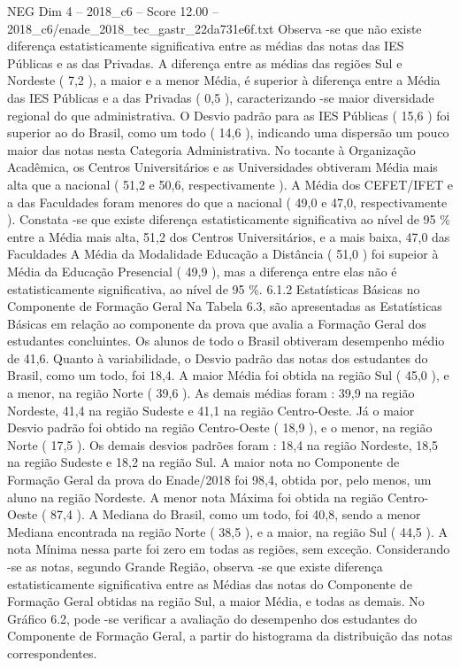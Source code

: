 \begin{textsample}{NEG Dim 4 – 2018\_c6 – Score 12.00 – 2018\_c6/enade\_2018\_tec\_gastr\_22da731e6f.txt}
Observa -se que não existe diferença estatisticamente significativa entre as médias das notas das IES Públicas e as das Privadas.
A diferença entre as médias das regiões Sul e Nordeste ( 7,2 ), a maior e a menor Média, é superior à diferença entre a Média das IES Públicas e a das Privadas ( 0,5 ), caracterizando -se maior diversidade regional do que administrativa.
O Desvio padrão para as IES Públicas ( 15,6 ) foi superior ao do Brasil, como um todo ( 14,6 ), indicando uma dispersão um pouco maior das notas nesta Categoria Administrativa.
No tocante à Organização Acadêmica, os Centros Universitários e as Universidades obtiveram Média mais alta que a nacional ( 51,2 e 50,6, respectivamente ).
A Média dos CEFET/IFET e a das Faculdades foram menores do que a nacional ( 49,0 e 47,0, respectivamente ).
Constata -se que existe diferença estatisticamente significativa ao nível de 95 \% entre a Média mais alta, 51,2 dos Centros Universitários, e a mais baixa, 47,0 das Faculdades A Média da Modalidade Educação a Distância ( 51,0 ) foi supeior à Média da Educação Presencial ( 49,9 ), mas a diferença entre elas não é estatisticamente significativa, ao nível de 95 \%. 6.1.2 Estatísticas Básicas no Componente de Formação Geral Na Tabela 6.3, são apresentadas as Estatísticas Básicas em relação ao componente da prova que avalia a Formação Geral dos estudantes concluintes.
Os alunos de todo o Brasil obtiveram desempenho médio de 41,6.
Quanto à variabilidade, o Desvio padrão das notas dos estudantes do Brasil, como um todo, foi 18,4.
A maior Média foi obtida na região Sul ( 45,0 ), e a menor, na região Norte ( 39,6 ).
As demais médias foram : 39,9 na região Nordeste, 41,4 na região Sudeste e 41,1 na região Centro-Oeste.
Já o maior Desvio padrão foi obtido na região Centro-Oeste ( 18,9 ), e o menor, na região Norte ( 17,5 ).
Os demais desvios padrões foram : 18,4 na região Nordeste, 18,5 na região Sudeste e 18,2 na região Sul.
A maior nota no Componente de Formação Geral da prova do Enade/2018 foi 98,4, obtida por, pelo menos, um aluno na região Nordeste.
A menor nota Máxima foi obtida na região Centro-Oeste ( 87,4 ).
A Mediana do Brasil, como um todo, foi 40,8, sendo a menor Mediana encontrada na região Norte ( 38,5 ), e a maior, na região Sul ( 44,5 ).
A nota Mínima nessa parte foi zero em todas as regiões, sem exceção.
Considerando -se as notas, segundo Grande Região, observa -se que existe diferença estatisticamente significativa entre as Médias das notas do Componente de Formação Geral obtidas na região Sul, a maior Média, e todas as demais.
No Gráfico 6.2, pode -se verificar a avaliação do desempenho dos estudantes do Componente de Formação Geral, a partir do histograma da distribuição das notas correspondentes.

\end{textsample}
